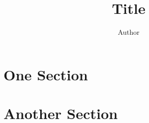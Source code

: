 \documentclass[10pt]{article}
\title{Title}
\author{Author}
\begin{document}
\maketitle

\tableofcontents
\section{One Section}
\section{Another Section}
\end{document}
